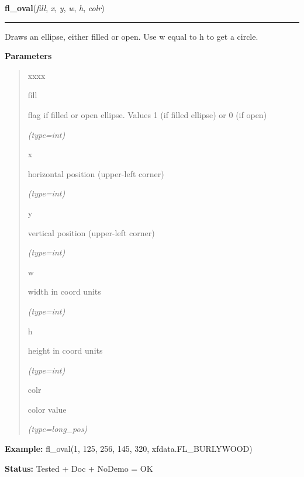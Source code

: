 \hspace{.8\funcindent}\begin{boxedminipage}{\funcwidth}

    \raggedright \textbf{fl\_oval}(\textit{fill}, \textit{x}, \textit{y}, \textit{w}, \textit{h}, \textit{colr})

    \vspace{-1.5ex}

    \rule{\textwidth}{0.5\fboxrule}
\setlength{\parskip}{2ex}
    Draws an ellipse, either filled or open. Use w equal to h to get a 
    circle.

\setlength{\parskip}{1ex}
      \textbf{Parameters}
      \vspace{-1ex}

      \begin{quote}
        \begin{Ventry}{xxxx}

          \item[fill]

          flag if filled or open ellipse. Values 1 (if filled ellipse) or 0
          (if open)

            {\it (type=int)}

          \item[x]

          horizontal position (upper-left corner)

            {\it (type=int)}

          \item[y]

          vertical position (upper-left corner)

            {\it (type=int)}

          \item[w]

          width in coord units

            {\it (type=int)}

          \item[h]

          height in coord units

            {\it (type=int)}

          \item[colr]

          color value

            {\it (type=long\_pos)}

        \end{Ventry}

      \end{quote}

\textbf{Example:} fl\_oval(1, 125, 256, 145, 320, xfdata.FL\_BURLYWOOD)



\textbf{Status:} Tested + Doc + NoDemo = OK



    \end{boxedminipage}

